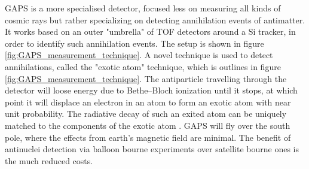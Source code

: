 GAPS is a more specialised detector, focused less on measuring all kinds of cosmic rays but rather specializing on detecting annihilation events of antimatter. It works based on an outer "umbrella" of TOF detectors around a Si tracker, in order to identify such annihilation events. The setup is shown in figure \ref{fig:GAPS_measurement_technique}. A novel technique is used to detect annihilations, called the "exotic atom" technique, which is outlines in figure \ref{fig:GAPS_measurement_technique}. The antiparticle travelling through the detector will loose energy due to Bethe--Bloch ionization until it stops, at which point it will displace an electron in an atom to form an exotic atom with near unit probability. The radiative decay of such an exited atom can be uniquely matched to the components of the exotic atom \cite{}. GAPS will fly over the south pole, where the effects from earth's magnetic field are minimal. The benefit of antinuclei detection via balloon bourne experiments over satellite bourne ones is the much reduced costs.\\

